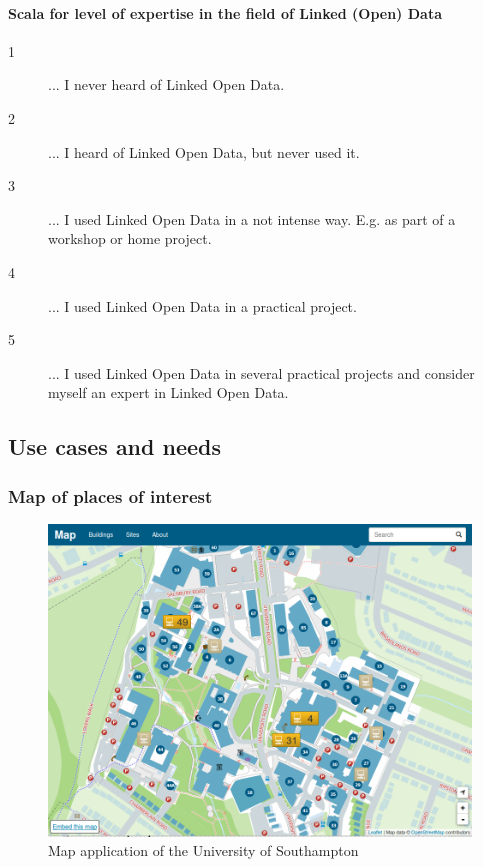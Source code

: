\documentclass{article}
\begin{document}
\paragraph*{Scala for level of expertise in the field of Linked (Open) Data}
\begin{description}
	\item[1] ... I never heard of Linked Open Data.
	\item[2] ... I heard of Linked Open Data, but never used it.
	\item[3] ... I used Linked Open Data in a not intense way. E.g. as part of a workshop or home project.
	\item[4] ... I used Linked Open Data in a practical project.
	\item[5] ... I used Linked Open Data in several practical projects and consider myself an expert in Linked Open Data.
\end{description}


\subsection{Use cases and needs}
\label{lod-benefits-challenges:explored-needs-usecases}


\subsubsection{Map of places of interest}
\label{lod-benefits-challenges:explored-needs-usecases:map}

\begin{figure}[t]
\label{fig:ush-map-app}
\centering \includegraphics*[width=1.0\columnwidth]{images/maps-app/southampton_map_app.png}
\caption{Map application of the University of Southampton}
\end{figure}
\end{document}
